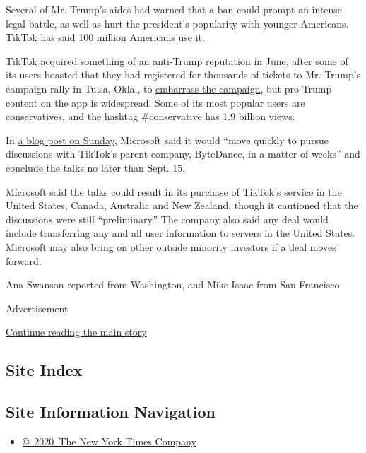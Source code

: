 Several of Mr. Trump's aides had warned that a ban could prompt an
intense legal battle, as well as hurt the president's popularity with
younger Americans. TikTok has said 100 million Americans use it.

TikTok acquired something of an anti-Trump reputation in June, after
some of its users boasted that they had registered for thousands of
tickets to Mr. Trump's campaign rally in Tulsa, Okla., to
\href{https://www.nytimes.com/2020/06/21/style/tiktok-trump-rally-tulsa.html}{embarrass
the campaign}, but pro-Trump content on the app is widespread. Some of
its most popular users are conservatives, and the hashtag \#conservative
has 1.9 billion views.

In
\href{https://blogs.microsoft.com/blog/2020/08/02/microsoft-to-continue-discussions-on-potential-tiktok-purchase-in-the-united-states/}{a
blog post on Sunday}, Microsoft said it would ``move quickly to pursue
discussions with TikTok's parent company, ByteDance, in a matter of
weeks'' and conclude the talks no later than Sept. 15.

Microsoft said the talks could result in its purchase of TikTok's
service in the United States, Canada, Australia and New Zealand, though
it cautioned that the discussions were still ``preliminary.'' The
company also said any deal would include transferring any and all user
information to servers in the United States. Microsoft may also bring on
other outside minority investors if a deal moves forward.

Ana Swanson reported from Washington, and Mike Isaac from San Francisco.

Advertisement

\protect\hyperlink{after-bottom}{Continue reading the main story}

\hypertarget{site-index}{%
\subsection{Site Index}\label{site-index}}

\hypertarget{site-information-navigation}{%
\subsection{Site Information
Navigation}\label{site-information-navigation}}

\begin{itemize}
\tightlist
\item
  \href{https://help.nytimes.com/hc/en-us/articles/115014792127-Copyright-notice}{©~2020~The
  New York Times Company}
\end{itemize}

